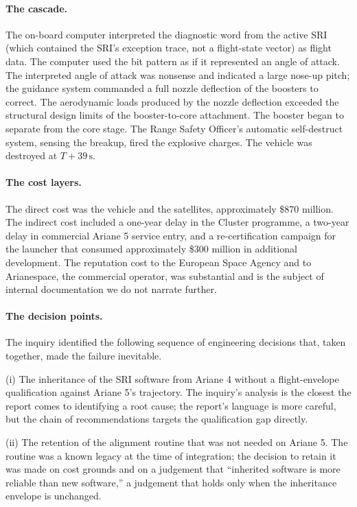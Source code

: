 \paragraph{The cascade.} The on-board computer interpreted the
diagnostic word from the active SRI (which contained the SRI's
exception trace, not a flight-state vector) as flight data. The
computer used the bit pattern as if it represented an angle of
attack. The interpreted angle of attack was nonsense and indicated a
large nose-up pitch; the guidance system commanded a full nozzle
deflection of the boosters to correct. The aerodynamic loads
produced by the nozzle deflection exceeded the structural design
limits of the booster-to-core attachment. The booster began to
separate from the core stage. The Range Safety Officer's automatic
self-destruct system, sensing the breakup, fired the explosive
charges. The vehicle was destroyed at $T+39 \,\si{\second}$.

\paragraph{The cost layers.} The direct cost was the vehicle and the
satellites, approximately \$870 million. The indirect cost included
a one-year delay in the Cluster programme, a two-year delay in
commercial Ariane 5 service entry, and a re-certification campaign
for the launcher that consumed approximately \$300 million in
additional development. The reputation cost to the European Space
Agency and to Arianespace, the commercial operator, was substantial
and is the subject of internal documentation we do not narrate
further.

\paragraph{The decision points.} The inquiry identified the
following sequence of engineering decisions that, taken together,
made the failure inevitable.

(i) The inheritance of the SRI software from Ariane 4 without a
flight-envelope qualification against Ariane 5's trajectory. The
inquiry's analysis is the closest the report comes to identifying a
root cause; the report's language is more careful, but the chain of
recommendations targets the qualification gap directly.

(ii) The retention of the alignment routine that was not needed on
Ariane 5. The routine was a known legacy at the time of
integration; the decision to retain it was made on cost grounds and
on a judgement that ``inherited software is more reliable than new
software,'' a judgement that holds only when the inheritance
envelope is unchanged.

